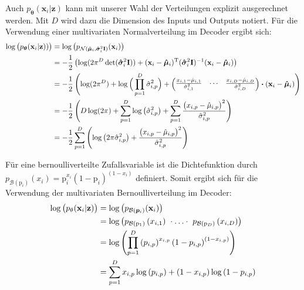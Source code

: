 \documentclass[12pt]{article}
\newcommand{\pdec}{p_{\boldsymbol\theta}(\mathbf{x}_i|\mathbf{z})}
\begin{document}
	Auch $\pdec$ kann mit unserer Wahl der Verteilungen explizit ausgerechnet werden.
	Mit $D$ wird dazu die Dimension des Inputs und Outputs notiert.
	Für die Verwendung einer multivariaten Normalverteilung im Decoder ergibt sich:
	\begin{align*}
	\log\big(\pdec)\big) &=  \log\big(p_{\mathcal{N}(\boldsymbol{\hat{\mu}}_{i},\boldsymbol{\hat{\sigma}}_{i}^{2}\textbf{I})}(\textbf{x}_{i})\big)\notag \\
	&= -\frac{1}{2}\left(\log(2\pi^{D} \det(\boldsymbol{\hat{\sigma}}_{i}^{2}\textbf{I}))+(\textbf{x}_{i}-\boldsymbol{\hat{\mu}}_{i})^{\mathrm{T}}(\boldsymbol{\hat{\sigma}}_{i}^{2}\textbf{I})^{-1}(\textbf{x}_{i}-\boldsymbol{\hat{\mu}}_{i})\right) \notag \\
	&= -\frac{1}{2}\left(\log(2\pi^{D})+\log\Big( \prod_{p=1}^{D}\hat{\sigma}_{i,p}^{2}\Big)+  \begin{pmatrix}  \frac{x_{i,1}-\hat{\mu}_{i,1}}{\hat{\sigma}_{i,1}^{2}}&\cdots& \frac{x_{i,D}-\hat{\mu}_{i,D}}{\hat{\sigma}_{i,D}^{2}}\end{pmatrix}
	\boldsymbol{\cdot}(\textbf{x}_{i}-\boldsymbol{\hat{\mu}}_{i})\right) \notag \\
	&= -\frac{1}{2}\left(D\log(2\pi)+\sum_{p=1}^{D}\log\left( \hat{\sigma}_{i,p}^{2}\right)+
	\sum_{p=1}^{D}\frac{\big(x_{i,p}-\hat{\mu}_{i,p}\big)^{2}}{\hat{\sigma}_{i,p}^{2}}\right) \notag \\
	&= -\frac{1}{2}\sum_{p=1}^{D} \left(\log\left(2\pi \hat{\sigma}_{i,p}^{2}\right) + \frac{\big(x_{i,p}-\hat{\mu}_{i,p}\big)^{2}}{\hat{\sigma}_{i,p}^{2}}\right)
	\end{align*}

	Für eine bernoulliverteilte Zufallsvariable ist die Dichtefunktion  durch $p_{\mathcal{B}(\mathrm{p}_{i})}(x_{i}) = \mathrm{p}_{i}^{x_{i}}(1-\mathrm{p}_{i})^{(1-x_{i})}$ definiert. Somit ergibt sich für die Verwendung der multivariaten Bernoulliverteilung im Decoder: \\
	\begin{align*}
	\log\big(p_{\theta}(\textbf{x}_{i}|\textbf{z})\big) &=  \log\big(p_{\mathcal{B}(\boldsymbol{p}_{i})}(\textbf{x}_{i})\big)\notag \\
	&= \log\left(p_{\mathcal{B}(\mathrm{p}_{1})}\left(x_{i,1}\right)\ \cdot\ldots\cdot \ p_{\mathcal{B}(\mathrm{p}_{D})}\left(x_{i,D}\right)\right)\notag \\
	&= \log\left(\prod_{p=1}^{D}\left(p_{i,p}\right)^{x_{i,p}}\left(1-p_{i,p}\right)^{\left(1-x_{i,p}\right)}\right) \notag \\
	&=  \sum_{p=1}^{D}x_{i,p}\log\left(p_{i,p}\right)+\left(1-x_{i,p}\right)\log\left(1-p_{i,p}\right)
	\end{align*}
\end{document}
